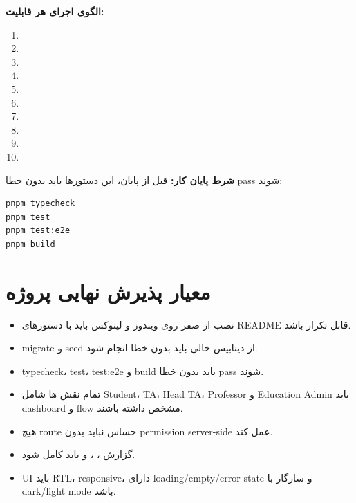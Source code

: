 \documentclass[11pt,a4paper]{article}
\begin{document}
\begin{framed}
\textbf{الگوی اجرای هر قابلیت:}
\begin{enumerate}
\item {}
\item {}
\item {}
\item {}
\item {}
\item {}
\item {}
\item {}
\item {}
\item {}
\end{enumerate}

\textbf{شرط پایان کار:} قبل از پایان، این دستورها باید بدون خطا pass شوند:
\begin{latin}
\begin{verbatim}
pnpm typecheck
pnpm test
pnpm test:e2e
pnpm build
\end{verbatim}
\end{latin}
\end{framed}

\section{معیار پذیرش نهایی پروژه}
\begin{itemize}
\item نصب از صفر روی ویندوز و لینوکس باید با دستورهای README قابل تکرار باشد.
\item migrate و seed از دیتابیس خالی باید بدون خطا انجام شود.
\item typecheck، test، test:e2e و build باید بدون خطا pass شوند.
\item تمام نقش ها شامل Student، TA، Head TA، Professor و Education Admin باید dashboard و flow مشخص داشته باشند.
\item هیچ route حساس نباید بدون permission server-side عمل کند.
\item گزارش ، ،  و  باید کامل شود.
\item UI باید RTL، responsive، دارای loading/empty/error state و سازگار با dark/light mode باشد.
\end{itemize}
\end{document}
